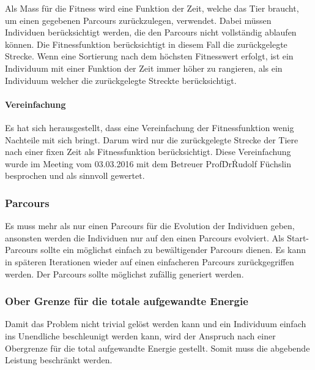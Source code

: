       Als Mass für die Fitness wird eine Funktion der Zeit, welche das Tier braucht,
      um einen gegebenen Parcours zurückzulegen, verwendet.
      Dabei müssen Individuen berücksichtigt werden,
      die den Parcours nicht vollständig ablaufen können.
      Die Fitnessfunktion berücksichtigt in diesem Fall die zurückgelegte Strecke.
      Wenn eine Sortierung nach dem höchsten Fitnesswert erfolgt,
      ist ein Individuum mit einer Funktion der Zeit immer höher zu rangieren,
      als ein Individuum welcher die zurückgelegte Streckte berücksichtigt.

      \paragraph{Vereinfachung}

        Es hat sich herausgestellt, dass eine Vereinfachung der Fitnessfunktion wenig Nachteile mit sich bringt.
        Darum wird nur die zurückgelegte Strecke der Tiere nach einer fixen Zeit als Fitnessfunktion berücksichtigt.
        Diese Vereinfachung wurde im Meeting vom 03.03.2016 mit dem Betreuer Prof\. Dr\. Rudolf Füchslin besprochen
        und als sinnvoll gewertet.

    \subsubsection{Parcours}

      Es muss mehr als nur einen Parcours für die Evolution der Individuen geben,
      ansonsten werden die Individuen nur auf den einen Parcours evolviert.
      Als Start-Parcours sollte ein möglichst einfach zu bewältigender Parcours dienen.
      Es kann in späteren Iterationen wieder auf einen einfacheren Parcours zurückgegriffen werden.
      Der Parcours sollte möglichst zufällig generiert werden.

    \subsubsection{Ober Grenze für die totale aufgewandte Energie}

      Damit das Problem nicht trivial gelöst werden kann
      und ein Individuum einfach ins Unendliche beschleunigt werden kann,
      wird der Anspruch nach einer Obergrenze für die total aufgewandte Energie gestellt.
      Somit muss die abgebende Leistung beschränkt werden.
